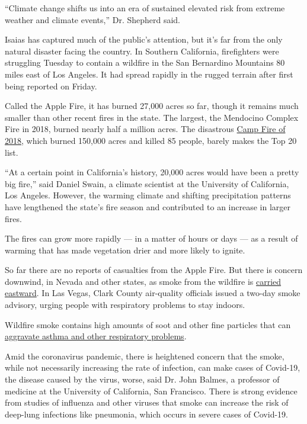 ``Climate change shifts us into an era of sustained elevated risk from
extreme weather and climate events,'' Dr. Shepherd said.

Isaias has captured much of the public's attention, but it's far from
the only natural disaster facing the country. In Southern California,
firefighters were struggling Tuesday to contain a wildfire in the San
Bernardino Mountains 80 miles east of Los Angeles. It had spread rapidly
in the rugged terrain after first being reported on Friday.

Called the Apple Fire, it has burned 27,000 acres so far, though it
remains much smaller than other recent fires in the state. The largest,
the Mendocino Complex Fire in 2018, burned nearly half a million acres.
The disastrous
\href{https://www.nytimes3xbfgragh.onion/interactive/2019/07/31/magazine/paradise-camp-fire-california.html}{Camp
Fire of 2018}, which burned 150,000 acres and killed 85 people, barely
makes the Top 20 list.

``At a certain point in California's history, 20,000 acres would have
been a pretty big fire,'' said Daniel Swain, a climate scientist at the
University of California, Los Angeles. However, the warming climate and
shifting precipitation patterns have lengthened the state's fire season
and contributed to an increase in larger fires.

The fires can grow more rapidly --- in a matter of hours or days --- as
a result of warming that has made vegetation drier and more likely to
ignite.

So far there are no reports of casualties from the Apple Fire. But there
is concern downwind, in Nevada and other states, as smoke from the
wildfire is
\href{https://rapidrefresh.noaa.gov/hrrr/HRRRsmoke/jsloopLocalDiskDateDomainZipTZA.cgi?dsKeys=hrrr_smoke_jet:\&runTime=2020080314\&plotName=trc1_t4sfc\&fcstInc=60\&numFcsts=49\&model=hrrr\&ptitle=HRRR-Smoke\%20Model\%20Fields\%20-\%20Experimental\&maxFcstLen=48\&fcstStrLen=-1\&resizePlot=1\&domain=t4}{carried
eastward}. In Las Vegas, Clark County air-quality officials issued a
two-day smoke advisory, urging people with respiratory problems to stay
indoors.

Wildfire smoke contains high amounts of soot and other fine particles
that can
\href{https://www.nytimes3xbfgragh.onion/2019/10/24/climate/california-wildfires-climate-change.html}{aggravate
asthma and other respiratory problems}.

Amid the coronavirus pandemic, there is heightened concern that the
smoke, while not necessarily increasing the rate of infection, can make
cases of Covid-19, the disease caused by the virus, worse, said Dr. John
Balmes, a professor of medicine at the University of California, San
Francisco. There is strong evidence from studies of influenza and other
viruses that smoke can increase the risk of deep-lung infections like
pneumonia, which occurs in severe cases of Covid-19.


